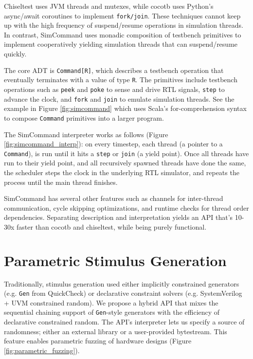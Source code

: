 \documentclass[sigplan,review,nonacm,9pt]{acmart}
\begin{document}
Chiseltest uses JVM threads and mutexes, while cocotb uses Python's async/await coroutines to implement \texttt{fork/join}.
These techniques cannot keep up with the high frequency of suspend/resume operations in simulation threads.
In contrast, SimCommand uses monadic composition of testbench primitives\cite{hardcaml_step_testbench} to implement cooperatively yielding simulation threads that can suspend/resume quickly.

The core ADT is \texttt{Command[R]}, which describes a testbench operation that eventually terminates with a value of type \texttt{R}.
The primitives include testbench operations such as \texttt{peek} and \texttt{poke} to sense and drive RTL signals, \texttt{step} to advance the clock, and \texttt{fork} and \texttt{join} to emulate simulation threads.
See the example in Figure \ref{fig:simcommand} which uses Scala's for-comprehension syntax to compose \texttt{Command} primitives into a larger program.

The SimCommand interpreter works as follows (Figure \ref{fig:simcommand_interp}): on every timestep, each thread (a pointer to a \texttt{Command}), is run until it hits a \texttt{step} or \texttt{join} (a yield point).
Once all threads have run to their yield point, and all recursively spawned threads have done the same, the scheduler steps the clock in the underlying RTL simulator, and repeats the process until the main thread finishes.

SimCommand has several other features such as channels for inter-thread communication, cycle skipping optimizations, and runtime checks for thread order dependencies.
Separating description and interpretation yields an API that's 10-30x faster than cocotb and chiseltest, while being purely functional.


\section{Parametric Stimulus Generation}

Traditionally, stimulus generation used either implicitly constrained generators (e.g. \texttt{Gen} from QuickCheck\cite{quickcheck}) or declarative constraint solvers (e.g. SystemVerilog + UVM constrained random\cite{riscv_dv}).
We propose a hybrid API that mixes the sequential chaining support of \texttt{Gen}-style generators with the efficiency of declarative constrained random.
The API's interpreter lets us specify a source of randomness; either an external library or a user-provided bytestream.
This feature enables parametric fuzzing\cite{zest} of hardware designs (Figure \ref{fig:parametric_fuzzing}).
\end{document}
